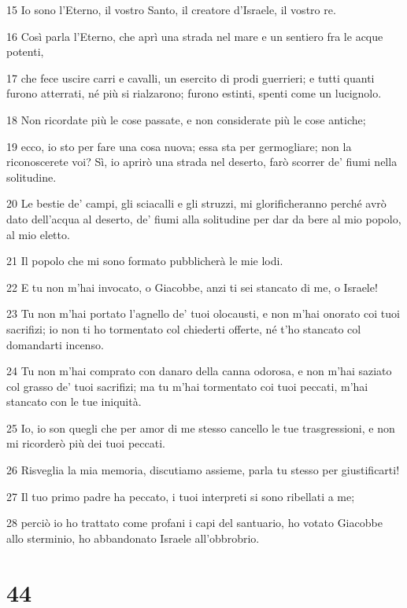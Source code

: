 \par 15 Io sono l'Eterno, il vostro Santo, il creatore d'Israele, il vostro re.
\par 16 Così parla l'Eterno, che aprì una strada nel mare e un sentiero fra le acque potenti,
\par 17 che fece uscire carri e cavalli, un esercito di prodi guerrieri; e tutti quanti furono atterrati, né più si rialzarono; furono estinti, spenti come un lucignolo.
\par 18 Non ricordate più le cose passate, e non considerate più le cose antiche;
\par 19 ecco, io sto per fare una cosa nuova; essa sta per germogliare; non la riconoscerete voi? Sì, io aprirò una strada nel deserto, farò scorrer de' fiumi nella solitudine.
\par 20 Le bestie de' campi, gli sciacalli e gli struzzi, mi glorificheranno perché avrò dato dell'acqua al deserto, de' fiumi alla solitudine per dar da bere al mio popolo, al mio eletto.
\par 21 Il popolo che mi sono formato pubblicherà le mie lodi.
\par 22 E tu non m'hai invocato, o Giacobbe, anzi ti sei stancato di me, o Israele!
\par 23 Tu non m'hai portato l'agnello de' tuoi olocausti, e non m'hai onorato coi tuoi sacrifizi; io non ti ho tormentato col chiederti offerte, né t'ho stancato col domandarti incenso.
\par 24 Tu non m'hai comprato con danaro della canna odorosa, e non m'hai saziato col grasso de' tuoi sacrifizi; ma tu m'hai tormentato coi tuoi peccati, m'hai stancato con le tue iniquità.
\par 25 Io, io son quegli che per amor di me stesso cancello le tue trasgressioni, e non mi ricorderò più dei tuoi peccati.
\par 26 Risveglia la mia memoria, discutiamo assieme, parla tu stesso per giustificarti!
\par 27 Il tuo primo padre ha peccato, i tuoi interpreti si sono ribellati a me;
\par 28 perciò io ho trattato come profani i capi del santuario, ho votato Giacobbe allo sterminio, ho abbandonato Israele all'obbrobrio.

\chapter{44}

